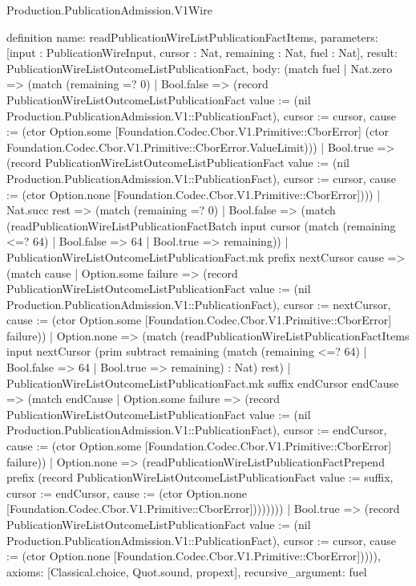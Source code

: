 \begin{lexlean}{Production.PublicationAdmission.V1Wire}
\begin{semanticmodule}
definition{
  name: readPublicationWireListPublicationFactItems,
  parameters: [input : PublicationWireInput, cursor : Nat, remaining : Nat, fuel : Nat],
  result: PublicationWireListOutcomeListPublicationFact,
  body: (match fuel
    | Nat.zero => (match (remaining =? 0)
      | Bool.false => (record PublicationWireListOutcomeListPublicationFact {value := (nil Production.PublicationAdmission.V1::PublicationFact), cursor := cursor, cause := (ctor Option.some [Foundation.Codec.Cbor.V1.Primitive::CborError] (ctor Foundation.Codec.Cbor.V1.Primitive::CborError.ValueLimit))})
      | Bool.true => (record PublicationWireListOutcomeListPublicationFact {value := (nil Production.PublicationAdmission.V1::PublicationFact), cursor := cursor, cause := (ctor Option.none [Foundation.Codec.Cbor.V1.Primitive::CborError])}))
    | Nat.succ rest => (match (remaining =? 0)
      | Bool.false => (match (readPublicationWireListPublicationFactBatch input cursor (match (remaining <=? 64)
          | Bool.false => 64
          | Bool.true => remaining))
        | PublicationWireListOutcomeListPublicationFact.mk prefix nextCursor cause => (match cause
          | Option.some failure => (record PublicationWireListOutcomeListPublicationFact {value := (nil Production.PublicationAdmission.V1::PublicationFact), cursor := nextCursor, cause := (ctor Option.some [Foundation.Codec.Cbor.V1.Primitive::CborError] failure)})
          | Option.none => (match (readPublicationWireListPublicationFactItems input nextCursor (prim subtract remaining (match (remaining <=? 64)
              | Bool.false => 64
              | Bool.true => remaining) : Nat) rest)
            | PublicationWireListOutcomeListPublicationFact.mk suffix endCursor endCause => (match endCause
              | Option.some failure => (record PublicationWireListOutcomeListPublicationFact {value := (nil Production.PublicationAdmission.V1::PublicationFact), cursor := endCursor, cause := (ctor Option.some [Foundation.Codec.Cbor.V1.Primitive::CborError] failure)})
              | Option.none => (readPublicationWireListPublicationFactPrepend prefix (record PublicationWireListOutcomeListPublicationFact {value := suffix, cursor := endCursor, cause := (ctor Option.none [Foundation.Codec.Cbor.V1.Primitive::CborError])}))))))
      | Bool.true => (record PublicationWireListOutcomeListPublicationFact {value := (nil Production.PublicationAdmission.V1::PublicationFact), cursor := cursor, cause := (ctor Option.none [Foundation.Codec.Cbor.V1.Primitive::CborError])}))),
  axioms: [Classical.choice, Quot.sound, propext],
  recursive_argument: fuel
}


\end{semanticmodule}
\end{lexlean}
